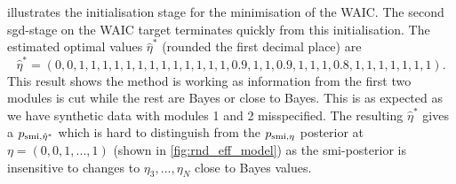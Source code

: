  illustrates the initialisation stage for the minimisation of the WAIC. The second \acrshort*{sgd}-stage on the WAIC target terminates quickly from this initialisation. The estimated optimal values $\hat\eta^*$ (rounded the first decimal place) are 
\[\hat\eta^*=(0,0,1,1,1,1,1,1,1,1,1,1,1,1,1,0.9,1,1,0.9,1,1,1,0.8,1,1,1,1,1,1,1).\]
This result shows the method is working as information from the first two modules is cut while the rest are Bayes or close to Bayes. This is as expected as we have synthetic data with modules 1 and 2 misspecified.
The resulting $\hat\eta^*$ gives a $p_{\operatorname{\text{smi}},\hat\eta^*}$ which is hard to distinguish from
the $p_{\operatorname{\text{smi}},\eta}$ posterior at $\eta=(0,0,1,...,1)$ (shown
in \cref{fig:rnd_eff_model}) as the \acrshort*{smi}-posterior is insensitive to changes to $\eta_3,...,\eta_N$ close to Bayes values.

